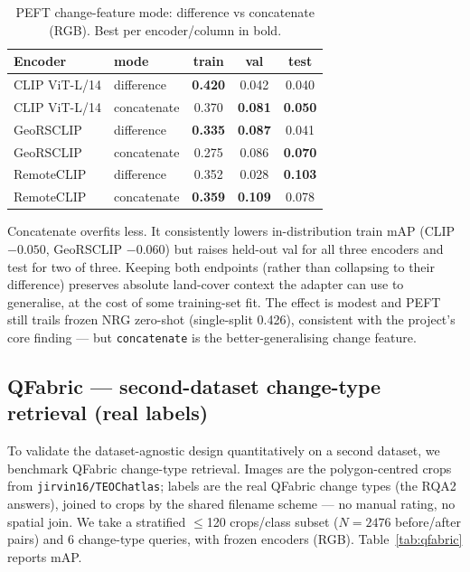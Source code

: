 \documentclass{article}
\begin{document}
\begin{table}[H]
    \centering
    \caption{PEFT change-feature mode: difference vs concatenate (RGB).
    Best per encoder/column in bold.}
    \label{tab:concat}
    \begin{tabular}{llccc}
        \toprule
        \textbf{Encoder} & \textbf{mode} & \textbf{train} & \textbf{val} & \textbf{test} \\
        \midrule
        CLIP ViT-L/14 & difference  & \textbf{0.420} & 0.042 & 0.040 \\
        CLIP ViT-L/14 & concatenate & 0.370 & \textbf{0.081} & \textbf{0.050} \\
        GeoRSCLIP     & difference  & \textbf{0.335} & \textbf{0.087} & 0.041 \\
        GeoRSCLIP     & concatenate & 0.275 & 0.086 & \textbf{0.070} \\
        RemoteCLIP    & difference  & 0.352 & 0.028 & \textbf{0.103} \\
        RemoteCLIP    & concatenate & \textbf{0.359} & \textbf{0.109} & 0.078 \\
        \bottomrule
    \end{tabular}
\end{table}

Concatenate overfits less. It consistently lowers in-distribution train
mAP (CLIP $-0.050$, GeoRSCLIP $-0.060$) but raises held-out val for all three
encoders and test for two of three. Keeping both endpoints (rather than
collapsing to their difference) preserves absolute land-cover context the
adapter can use to generalise, at the cost of some training-set fit. The effect
is modest and PEFT still trails frozen NRG zero-shot (single-split 0.426), consistent with the
project's core finding --- but \texttt{concatenate} is the better-generalising
change feature.

\subsection{QFabric --- second-dataset change-type retrieval (real labels)}
\label{sec:qfabric}

To validate the dataset-agnostic design quantitatively on a second
dataset, we benchmark QFabric change-type retrieval. Images are the
polygon-centred crops from \texttt{jirvin16/TEOChatlas}; labels are the real
QFabric change types (the RQA2 answers), joined to crops by the shared filename
scheme --- no manual rating, no spatial join. We take a stratified
$\leq$120 crops/class subset ($N = 2476$ before/after pairs) and 6 change-type
queries, with frozen encoders (RGB). Table~\ref{tab:qfabric} reports mAP.
\end{document}
